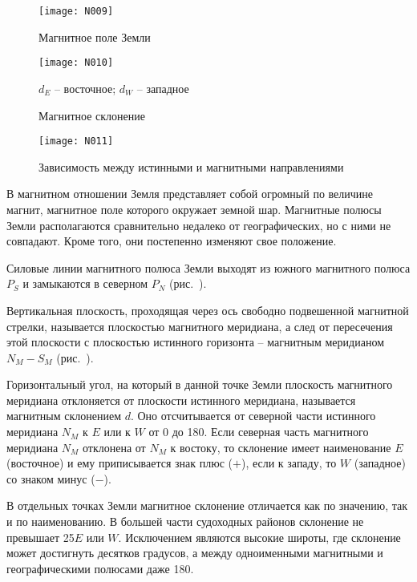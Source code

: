 \begin{figure}[htb]
  \centering{}
  \texttt{[image: N009]}
  \caption{Магнитное поле Земли}
  \label{fig:N9}
\end{figure}

\begin{figure}[htb]
  \centering{}
  \texttt{[image: N010]}
  \caption{Магнитное склонение}
  \label{fig:N10}
  \small
  \centering{}
  $d_E$ \--- восточное; $d_W$ \--- западное
\end{figure}

\begin{figure*}[htb]
  \centering{}
  \texttt{[image: N011]}
  \caption{Зависимость между истинными и магнитными направлениями}
  \label{fig:N11}
\end{figure*}

В магнитном отношении Земля представляет собой огромный по величине магнит, магнитное поле которого окружает земной шар. Магнитные полюсы Земли располагаются сравнительно недалеко от географических, но с ними не совпадают. Кроме того, они постепенно изменяют свое положение. 

Силовые линии магнитного полюса Земли выходят из южного магнитного полюса $P_S$ и замыкаются в северном $P_N$ (рис.~). 

Вертикальная плоскость, проходящая через ось свободно подвешенной магнитной стрелки, называется плоскостью магнитного меридиана, а след от пересечения этой плоскости с плоскостью истинного горизонта \--- магнитным меридианом $N_M - S_M$ (рис.~). 

Горизонтальный угол, на который в данной точке Земли плоскость магнитного меридиана отклоняется от плоскости истинного меридиана, называется магнитным склонением $d$. Оно отсчитывается от северной части истинного меридиана $N_M$ к $E$ или к $W$ от 0 до 180\gr. Если северная часть магнитного меридиана $N_M$ отклонена от $N_M$ к востоку, то склонение имеет наименование $E$ (восточное) и ему приписывается знак плюс ($+$), если к западу, то $W$ (западное) со знаком минус ($-$). 

В отдельных точках Земли магнитное склонение отличается как по значению, так и по наименованию. В большей части судоходных районов склонение не превышает 25\gr $E$ или $W$. Исключением являются высокие широты, где склонение может достигнуть десятков градусов, а между одноименными магнитными и географическими полюсами даже 180\gr.

